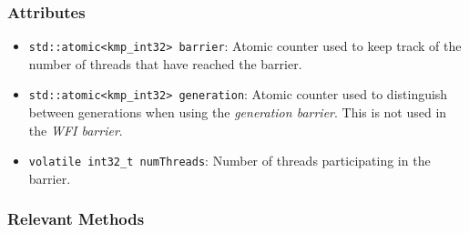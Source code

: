 \subsubsection{Attributes}
\begin{itemize}
	\item \texttt{std::atomic<kmp_int32> barrier}: Atomic counter used to keep track of the number of
	      threads that have reached the barrier.
	\item \texttt{std::atomic<kmp_int32> generation}: Atomic counter used to distinguish between
	      generations when using the \emph{generation barrier}. This is not used in the \emph{WFI
		      barrier}.
	\item \texttt{volatile int32_t numThreads}: Number of threads participating in the barrier.
\end{itemize}

\subsubsection{Relevant Methods}

